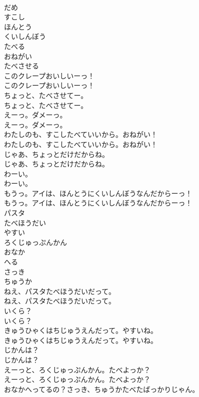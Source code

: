 \documentclass[8pt]{extreport}
\begin{document}
\begin{CJK}{UTF8}{min}
\\	だめ
\\	すこし
\\	ほんとう
\\	くいしんぼう
\\	たべる
\\	おねがい
\\	たべさせる
\\	このクレープおいしいーっ！	
\\	このクレープおいしいーっ！ 
\\	ちょっと、たべさせてー。	
\\	ちょっと、たべさせてー。 
\\	えーっ。ダメーっ。	
\\	えーっ。ダメーっ。 
\\	わたしのも、すこしたべていいから。おねがい！	
\\	わたしのも、すこしたべていいから。おねがい！ 
\\	じゃあ、ちょっとだけだからね。	
\\	じゃあ、ちょっとだけだからね。 
\\	わーい。	
\\	わーい。 
\\	もうっ。アイは、ほんとうにくいしんぼうなんだからーっ！	
\\	もうっ。アイは、ほんとうにくいしんぼうなんだからーっ！ 
\\	パスタ
\\	たべほうだい
\\	やすい
\\	ろくじゅっぷんかん
\\	おなか
\\	へる
\\	さっき
\\	ちゅうか
\\	ねえ、パスタたべほうだいだって。	
\\	ねえ、パスタたべほうだいだって。 
\\	いくら？	
\\	いくら？ 
\\	きゅうひゃくはちじゅうえんだって。やすいね。	
\\	きゅうひゃくはちじゅうえんだって。やすいね。 
\\	じかんは？	
\\	じかんは？ 
\\	えーっと、ろくじゅっぷんかん。たべよっか？	
\\	えーっと、ろくじゅっぷんかん。たべよっか？ 
\\	おなかへってるの？さっき、ちゅうかたべたばっかりじゃん。	

\end{CJK}
\end{document}
